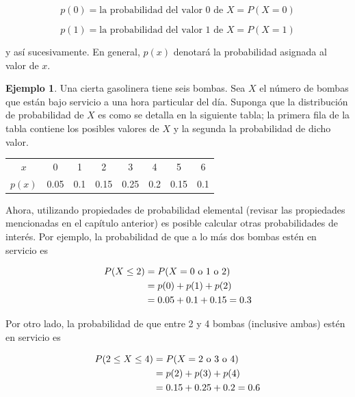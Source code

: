 \documentclass[
  11pt,
]{book}
\theoremstyle{definition}
\theoremstyle{definition}
\newtheorem{example}{Ejemplo}[chapter]
\theoremstyle{definition}
\theoremstyle{definition}
\theoremstyle{remark}
\begin{document}
\[p(0) = \text{la probabilidad del valor 0 de } X = P(X = 0)\]

\[p(1) = \text{la probabilidad del valor 1 de } X = P(X = 1)\]

y así sucesivamente. En general, \(p(x)\) denotará la probabilidad asignada al valor de \(x\).

\begin{example}

Una cierta gasolinera tiene seis bombas. Sea \(X\) el número de bombas que están bajo servicio a una hora particular del día. Suponga que la distribución de probabilidad de \(X\) es como se detalla en la siguiente tabla; la primera fila de la tabla contiene los posibles valores de \(X\) y la segunda la probabilidad de dicho valor.

\begin{table}[H]
\centering
\begin{tabular}[t]{cccccccc}
\toprule
$x$ & 0 & 1 & 2 & 3 & 4 & 5 & 6\\
$p(x)$ & 0.05 & 0.1 & 0.15 & 0.25 & 0.2 & 0.15 & 0.1\\
\bottomrule
\end{tabular}
\end{table}

Ahora, utilizando propiedades de probabilidad elemental (revisar las propiedades mencionadas en el capítulo anterior) es posible calcular otras probabilidades de interés. Por ejemplo, la probabilidad de que a lo más dos bombas estén en servicio es

\begin{equation}
  \notag
  \begin{split}
    P(X\leq 2) &= P(X = 0 \text{ o } 1 \text{ o } 2) \\
    & = p(0) + p(1) + p(2) \\
    & = 0.05 + 0.1 + 0.15 = 0.3
  \end{split}
\end{equation}

Por otro lado, la probabilidad de que entre 2 y 4 bombas (inclusive ambas) estén en servicio es

\begin{equation}
  \notag
  \begin{split}
    P(2\leq X\leq 4) &= P(X = 2 \text{ o } 3 \text{ o } 4)\\
    & = p(2) + p(3) + p(4) \\
    & = 0.15 + 0.25 + 0.2 = 0.6
  \end{split}
\end{equation}

\end{example}
\end{document}
